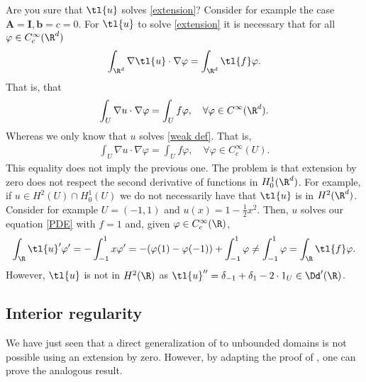 \documentclass[
    a4paper,
    DIV=14,
    abstract=true,
    numbers=noenddot
]{scrartcl}
\begin{document}
\begin{hint}
    Are you sure that $\tl{u}$ solves \eqref{extension}? Consider for example the case $\bm{A}= \bm{I}, \bm{b}=c=0$.
    For $\tl{u} $ to solve \eqref{extension} it is necessary that for all $\varphi \in C_c^\infty(\R^d)$
    \begin{align*}
        \int_{\R^d} \nabla \tl{u} \cdot \nabla \varphi = \int_{\R^d} \tl{f} \varphi.
    \end{align*}
    That is, that
    \begin{align*}
        \int_{U} \nabla u \cdot \nabla \varphi = \int_{U} f \varphi, \quad \forall \varphi \in C^\infty(\R^d).
    \end{align*}
    Whereas we only know that $u$ solves \eqref{weak def}. That is,
    \begin{align*}
        \int_{U} \nabla u \cdot \nabla \varphi = \int_{U} f \varphi, \quad \forall \varphi \in C_c^\infty(U).
    \end{align*}
    This equality does not imply the previous one. The problem is that extension by zero does not respect the second derivative of functions in $H_0^1(\R^d)$. For example, if $u \in H^2(U) \cap H_0^1(U)$ we do not necessarily have that $\tl{u} $ is in $H^2(\R^d)$. Consider for example $U=(-1,1)$ and $u(x)=1-\frac{1}{2} x^2$. Then, $u$ solves our equation \eqref{PDE} with $f=1$ and, given $\varphi \in C_c^\infty(\R)$,
    \begin{align*}
        \int_{\R}\tl{u} ' \varphi ' = -\int_{-1}^1 x \varphi' =-(\varphi (1)-\varphi(-1) )+ \int_{-1}^1 \varphi \neq \int_{-1}^1 \varphi = \int_\R \tl{f} \varphi.
    \end{align*}
    However, $\tl{u}$ is not in $H^2(\R)$ as $\tl{u}''= \delta _{-1}+ \delta _1 -2 \cdot  1_U \in \Dd '(\R)$.
\end{hint}

\subsection{Interior regularity}
We have just seen that a direct generalization of  to unbounded domains is not possible using an extension by zero. However, by adapting the proof of , one can prove the analogous result.
\end{document}
